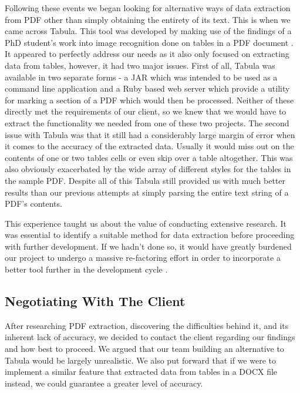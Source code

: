 \documentclass{l3proj}
\begin{document}
Following these events we began looking for alternative ways of data extraction from PDF other than simply obtaining the entirety of its text. This is when we came across Tabula. This tool was developed by making use of the findings of a PhD student's work into image recognition done on tables in a PDF document \cite{PDFResearch}. It appeared to perfectly address our needs as it also only focused on extracting data from tables, however, it had two major issues. First of all, Tabula was available in two separate forms - a JAR which was intended to be used as a command line application and a Ruby based web server which provide a utility for marking a section of a PDF which would then be processed. Neither of these directly met the requirements of our client, so we knew that we would have to extract the functionality we needed from one of these two projects. The second issue with Tabula was that it still had a considerably large margin of error when it comes to the accuracy of the extracted data. Usually it would miss out on the contents of one or two tables cells or even skip over a table altogether. This was also obviously exacerbated by the wide array of different styles for the tables in the sample PDF. Despite all of this Tabula still provided us with much better results than our previous attempts at simply parsing the entire text string of a PDF's contents.

This experience taught us about the value of conducting extensive research. It was essential to identify a suitable method for data extraction before proceeding with further development. If we hadn't done so, it would have greatly burdened our project to undergo a massive re-factoring effort in order to incorporate a better tool further in the development cycle \cite{ProjectPlanning}.

\subsection{Negotiating With The Client}
\label{sec:nego_client}
After researching PDF extraction, discovering the difficulties behind it, and its inherent lack of accuracy, we decided to contact the client regarding our findings and how best to proceed. We argued that our team building an alternative to Tabula would be largely unrealistic. We also put forward that if we were to implement a similar feature that extracted data from tables in a DOCX file instead, we could guarantee a greater level of accuracy.
\end{document}

